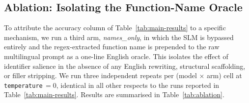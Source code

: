 \documentclass[11pt,a4paper,twocolumn]{article}
\begin{document}
\subsection{Ablation: Isolating the Function-Name Oracle}
\label{sec:ablation}
To attribute the accuracy column of Table~\ref{tab:main-results} to a specific mechanism, we run a third arm, \textit{names\_only}, in which the SLM is bypassed entirely and the regex-extracted function name is prepended to the raw multilingual prompt as a one-line English oracle. This isolates the effect of identifier salience in the absence of any English rewriting, structural scaffolding, or filler stripping. We run three independent repeats per (model $\times$ arm) cell at \texttt{temperature}\,$=0$, identical in all other respects to the runs reported in Table~\ref{tab:main-results}. Results are summarised in Table~\ref{tab:ablation}.
\end{document}
